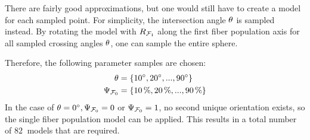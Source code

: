 There are fairly good approximations, but one would still have to create a model for each sampled point.
For simplicity, the intersection angle $\textnormal{$\theta$}$ is sampled instead.
By rotating the model with $\textnormal{$R_{\textnormal{$\mathcal{F}_1$}}$}$ along the first fiber population axis for all sampled crossing angles $\textnormal{$\theta$}$, one can sample the entire sphere.
\par
% 
Therefore, the following parameter samples are chosen:
% 
\begin{align}
    \begin{split}
        \textnormal{$\theta$} &= \{\SI{10}{\degree}, \SI{20}{\degree}, ..., \SI{90}{\degree}\}\\
        \textnormal{$\Psi_{\textnormal{$\mathcal{F}_0$}}$} &= \{\SI{10}{\percent}, \SI{20}{\percent}, ..., \SI{90}{\percent}\}
    \end{split}
\end{align}
% 
In the case of $\textnormal{$\theta$} = \SI{0}{\degree}, \textnormal{$\Psi_{\textnormal{$\mathcal{F}_0$}}$} = 0$ or $\textnormal{$\Psi_{\textnormal{$\mathcal{F}_0$}}$} = 1$, no second unique orientation exists, so the single fiber population model can be applied.
This results in a total number of $\SI{82}{}$ models that are required.
%
% 
% 
